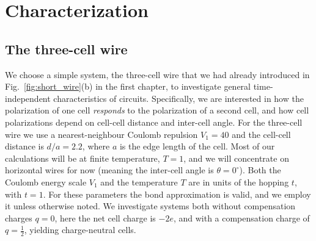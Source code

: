 \chapter{Characterization}
\graphicspath{{../gfx/chapter03/}{../plots/chapter03/}}


\section{The three-cell wire}

We choose a simple  system, the three-cell wire that we had already
introduced in Fig.~\ref{fig:short_wire}(b) in the first chapter, to investigate
general time-independent characteristics of  circuits. Specifically,
we are interested in how the polarization of one cell \emph{responds} to the
polarization of a second cell, and how cell polarizations depend on cell-cell
distance and inter-cell angle. For the three-cell wire we use a
nearest-neighbour Coulomb repulsion $V_1 = 40$ and the cell-cell distance is
$d/a = 2.2$, where $a$ is the edge length of the cell. Most of our calculations
will be at finite temperature, $T = 1$, and we will concentrate on horizontal
wires for now (meaning the inter-cell angle is $\theta = 0^{\circ}$). Both the
Coulomb energy scale $V_1$ and the temperature $T$ are in units of the hopping
$t$, with $t = 1$. For these parameters the bond approximation is valid, and we
employ it unless otherwise noted. We investigate systems both without
compensation charges $q = 0$, here the net cell charge is $-2e$, and with a
compensation charge of $q=\frac{1}{2}$, yielding charge-neutral cells.

